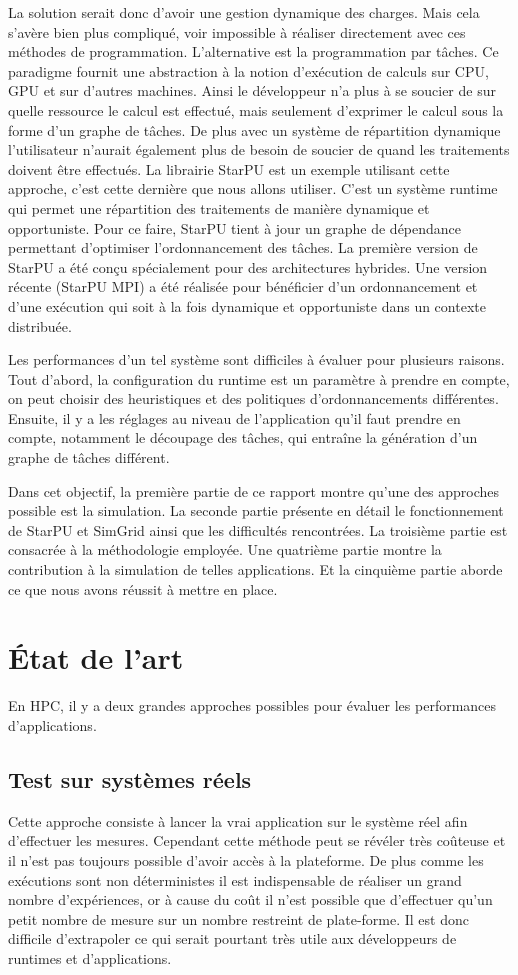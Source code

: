 \documentclass[smallextended]{svjour3}
\begin{document}
La solution serait donc d'avoir une gestion dynamique des
charges. Mais cela s'avère bien plus compliqué, voir impossible
à réaliser directement avec ces méthodes de
programmation. L'alternative est la programmation par tâches. Ce     
paradigme fournit une abstraction à la notion d'exécution de calculs sur CPU,
GPU et sur d'autres machines. Ainsi le développeur n'a plus à se
soucier de sur quelle ressource le calcul est effectué, mais
seulement d'exprimer le calcul sous la forme d'un graphe de
tâches. De plus avec un système de répartition dynamique
l'utilisateur n'aurait également plus de besoin de soucier de quand
les traitements doivent être effectués. La librairie
StarPU\cite{StarPU} est un exemple utilisant cette approche, c'est
cette dernière que nous allons utiliser. C'est un système runtime
qui permet une répartition des traitements de manière dynamique et
opportuniste. Pour ce faire, StarPU tient à jour un graphe de dépendance
permettant d'optimiser l'ordonnancement des tâches. La première
version de StarPU a été conçu spécialement pour des architectures
hybrides. Une version récente (StarPU MPI)\cite{StarPU-MPI} a été 
réalisée pour bénéficier d'un ordonnancement et d'une exécution qui
soit à la fois dynamique et opportuniste dans un contexte distribuée.

Les performances d'un tel système sont difficiles à évaluer pour
plusieurs raisons. Tout d'abord, la configuration du runtime
est un paramètre à prendre en compte, on peut choisir des
heuristiques et des politiques d'ordonnancements différentes.
Ensuite, il y a les réglages au niveau de l'application qu'il faut
prendre en compte, notamment le découpage des tâches, qui entraîne
la génération d'un graphe de tâches différent.

Dans cet objectif, la première partie de ce rapport montre qu'une
des approches possible est la simulation. La seconde partie
présente en détail le fonctionnement de StarPU et SimGrid 
ainsi que les difficultés rencontrées. La troisième partie est
consacrée à la méthodologie employée.  Une quatrième partie montre la
contribution à la simulation de telles applications.  Et la
cinquième partie aborde ce que nous avons réussit à mettre en place. 

\section{État de l'art}
\label{sec-2}
En HPC, il y a deux grandes approches possibles pour évaluer les
performances d'applications.
\subsection{Test sur systèmes réels}
\label{sec-2-1}
Cette approche consiste à lancer la vrai application sur le système
réel afin d'effectuer les mesures. Cependant cette méthode peut se 
révéler très coûteuse et il n'est pas toujours possible d'avoir
accès à la plateforme. De plus comme les exécutions sont non
déterministes il est indispensable de réaliser un grand nombre
d'expériences, or à cause du coût il n'est possible que d'effectuer
qu'un petit nombre de mesure sur un nombre restreint de
plate-forme. Il est donc difficile d'extrapoler ce qui serait
pourtant très utile aux développeurs de runtimes et d'applications. 
\end{document}
